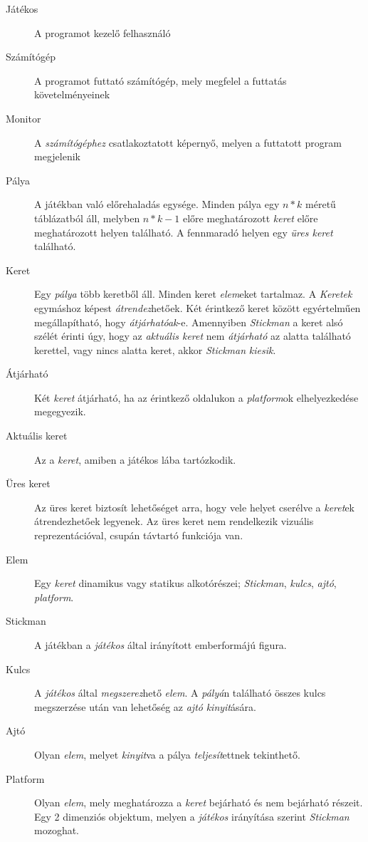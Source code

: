\begin{description}

    \item[Játékos] A programot kezelő felhasználó
    \item[Számítógép] A programot futtató számítógép, mely megfelel a futtatás követelményeinek
    \item[Monitor] A \emph{számítógéphez} csatlakoztatott képernyő, melyen a futtatott program megjelenik
    \item[Pálya] A játékban való előrehaladás egysége. Minden pálya egy $n*k$ méretű táblázatból áll, melyben $n*k-1$ előre meghatározott \emph{keret} előre meghatározott helyen található. A fennmaradó helyen egy \emph{üres keret} található.
    \item[Keret] Egy \emph{pálya} több keretből áll. Minden keret \emph{elem}eket tartalmaz. A \emph{Keretek} egymáshoz képest \emph{átrendez}hetőek. Két érintkező keret között egyértelműen megállapítható, hogy \emph{átjárhatóak}-e. Amennyiben \emph{Stickman} a keret alsó szélét érinti úgy, hogy az \emph{aktuális keret} nem \emph{átjárható} az alatta található kerettel, vagy nincs alatta keret, akkor \emph{Stickman} \emph{kiesik}.
    \item[Átjárható] Két \emph{keret} átjárható, ha az érintkező oldalukon a \emph{platform}ok elhelyezkedése megegyezik.
    \item[Aktuális keret] Az a \emph{keret}, amiben a játékos lába tartózkodik.
    \item[Üres keret] Az üres keret biztosít lehetőséget arra, hogy vele helyet cserélve a \emph{keret}ek átrendezhetőek legyenek. Az üres keret nem rendelkezik vizuális reprezentációval, csupán távtartó funkciója van.
    \item[Elem] Egy \emph{keret} dinamikus vagy statikus alkotórészei; \emph{Stickman}, \emph{kulcs}, \emph{ajtó}, \emph{platform}.
    \item[Stickman] A játékban a \emph{játékos} által irányított emberformájú figura.
    \item[Kulcs] A \emph{játékos} által \emph{megszerez}hető \emph{elem}. A \emph{pályá}n található összes kulcs megszerzése után van lehetőség az \emph{ajtó} \emph{kinyit}ására.
    \item[Ajtó] Olyan \emph{elem}, melyet \emph{kinyit}va a pálya \emph{teljesít}ettnek tekinthető.
    \item[Platform] Olyan \emph{elem}, mely meghatározza a \emph{keret} bejárható és nem bejárható részeit. Egy 2 dimenziós objektum, melyen a \emph{játékos} irányítása szerint \emph{Stickman} mozoghat.

\end{description}
